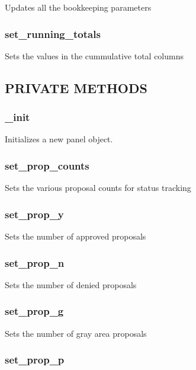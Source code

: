 \documentclass{article}
\begin{document}
Updates all the bookkeeping parameters

\subsubsection*{set\_running\_totals\label{Panel_set_running_totals}}


Sets the values in the cummulative total columns

\subsection*{PRIVATE METHODS\label{Panel_PRIVATE_METHODS}}
\subsubsection*{\_init\label{Panel__init}}


Initializes a new panel object.

\subsubsection*{set\_prop\_counts\label{Panel_set_prop_counts}}


Sets the various proposal counts for status tracking

\subsubsection*{set\_prop\_y\label{Panel_set_prop_y}}


Sets the number of approved proposals

\subsubsection*{set\_prop\_n\label{Panel_set_prop_n}}


Sets the number of denied proposals

\subsubsection*{set\_prop\_g\label{Panel_set_prop_g}}


Sets the number of gray area proposals

\subsubsection*{set\_prop\_p\label{Panel_set_prop_p}}
\end{document}
